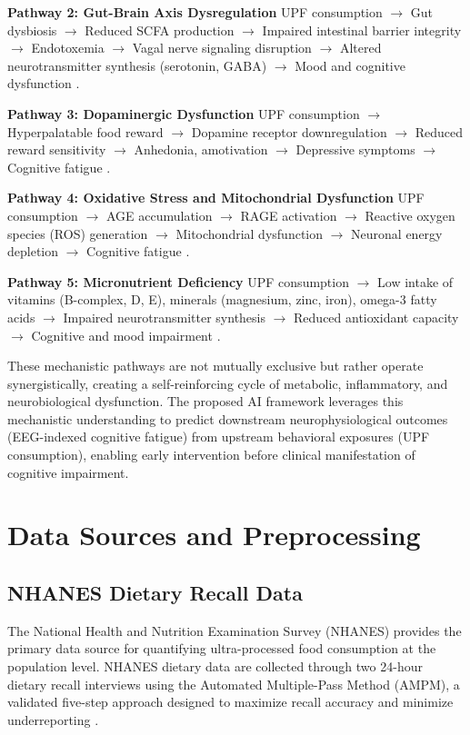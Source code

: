 \documentclass[journal,twoside,10pt]{IEEEtran}
\begin{document}
\textbf{Pathway 2: Gut-Brain Axis Dysregulation}
UPF consumption $\rightarrow$ Gut dysbiosis $\rightarrow$ Reduced SCFA production $\rightarrow$ Impaired intestinal barrier integrity $\rightarrow$ Endotoxemia $\rightarrow$ Vagal nerve signaling disruption $\rightarrow$ Altered neurotransmitter synthesis (serotonin, GABA) $\rightarrow$ Mood and cognitive dysfunction \cite{ref9,ref37,ref39,ref53}.

\textbf{Pathway 3: Dopaminergic Dysfunction}
UPF consumption $\rightarrow$ Hyperpalatable food reward $\rightarrow$ Dopamine receptor downregulation $\rightarrow$ Reduced reward sensitivity $\rightarrow$ Anhedonia, amotivation $\rightarrow$ Depressive symptoms $\rightarrow$ Cognitive fatigue \cite{ref3,ref4,ref41}.

\textbf{Pathway 4: Oxidative Stress and Mitochondrial Dysfunction}
UPF consumption $\rightarrow$ AGE accumulation $\rightarrow$ RAGE activation $\rightarrow$ Reactive oxygen species (ROS) generation $\rightarrow$ Mitochondrial dysfunction $\rightarrow$ Neuronal energy depletion $\rightarrow$ Cognitive fatigue \cite{ref10,ref13}.

\textbf{Pathway 5: Micronutrient Deficiency}
UPF consumption $\rightarrow$ Low intake of vitamins (B-complex, D, E), minerals (magnesium, zinc, iron), omega-3 fatty acids $\rightarrow$ Impaired neurotransmitter synthesis $\rightarrow$ Reduced antioxidant capacity $\rightarrow$ Cognitive and mood impairment \cite{ref5,ref7,ref13}.

These mechanistic pathways are not mutually exclusive but rather operate synergistically, creating a self-reinforcing cycle of metabolic, inflammatory, and neurobiological dysfunction. The proposed AI framework leverages this mechanistic understanding to predict downstream neurophysiological outcomes (EEG-indexed cognitive fatigue) from upstream behavioral exposures (UPF consumption), enabling early intervention before clinical manifestation of cognitive impairment.



\section{Data Sources and Preprocessing}

\subsection{NHANES Dietary Recall Data}

The National Health and Nutrition Examination Survey (NHANES) provides the primary data source for quantifying ultra-processed food consumption at the population level. NHANES dietary data are collected through two 24-hour dietary recall interviews using the Automated Multiple-Pass Method (AMPM), a validated five-step approach designed to maximize recall accuracy and minimize underreporting \cite{ref18,ref26,ref47}.
\end{document}
